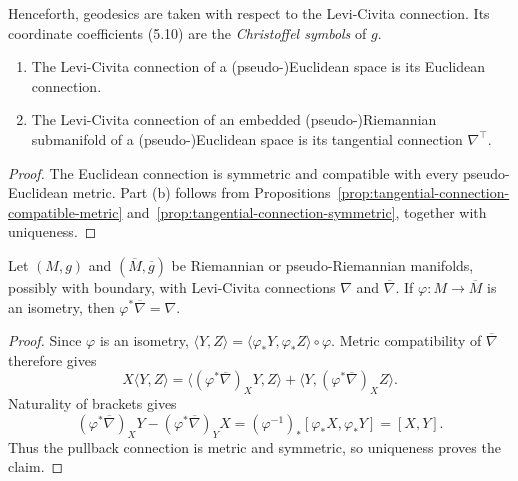 Henceforth, geodesics are taken with respect to the Levi-Civita connection.
Its coordinate coefficients (5.10) are the \emph{Christoffel symbols} of $g$.

\begin{proposition}
\label{prop:levi-civita-on-euclidean-and-submanifolds}


\begin{enumerate}
\item[(a)] The Levi-Civita connection of a (pseudo-)Euclidean space is its
Euclidean connection.
\item[(b)] The Levi-Civita connection of an embedded (pseudo-)Riemannian
submanifold of a (pseudo-)Euclidean space is its tangential connection
$\nabla^\top$.
\end{enumerate}

\begin{proof}
\sketch The Euclidean connection is symmetric and compatible with every
pseudo-Euclidean metric. Part (b) follows from
Propositions~\ref{prop:tangential-connection-compatible-metric}
and~\ref{prop:tangential-connection-symmetric}, together with uniqueness.
\end{proof}
\end{proposition}

\begin{proposition}
\label{prop:naturality-levi-civita}


Let $(M,g)$ and $(\overline M,\overline g)$ be Riemannian or
pseudo-Riemannian manifolds, possibly with boundary, with Levi-Civita
connections $\nabla$ and $\overline\nabla$. If
$\varphi:M\to\overline M$ is an isometry, then
$\varphi^*\overline\nabla=\nabla$.

\begin{proof}
\sketch Since $\varphi$ is an isometry,
$\langle Y,Z\rangle=\langle\varphi_*Y,\varphi_*Z\rangle\circ\varphi$.
Metric compatibility of $\overline\nabla$ therefore gives
\[
X\langle Y,Z\rangle
=\langle(\varphi^*\overline\nabla)_XY,Z\rangle
+\langle Y,(\varphi^*\overline\nabla)_XZ\rangle.
\]
Naturality of brackets gives
\[
(\varphi^*\overline\nabla)_XY-(\varphi^*\overline\nabla)_YX
=(\varphi^{-1})_*[\varphi_*X,\varphi_*Y]=[X,Y].
\]
Thus the pullback connection is metric and symmetric, so uniqueness proves the
claim.
\end{proof}
\end{proposition}

